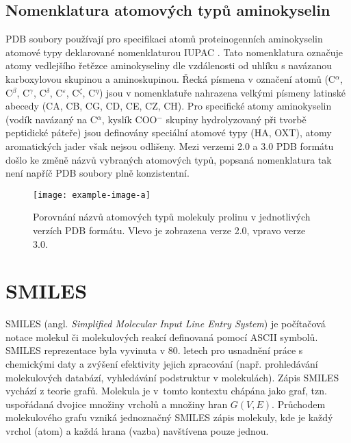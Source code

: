 \subsection{Nomenklatura atomových typů aminokyselin}
PDB soubory používají pro specifikaci atomů proteinogenních aminokyselin atomové typy deklarované nomenklaturou IUPAC \cite{AA_nomenclature}. Tato nomenklatura označuje atomy vedlejšího řetězce aminokyseliny dle vzdálenosti od uhlíku s navázanou karboxylovou skupinou a aminoskupinou. Řecká písmena v označení atomů (C$^\alpha$, C$^\beta$, C$^\gamma$, C$^\delta$, C$^\varepsilon$, C$^\zeta$, C$^\eta$) jsou v nomenklatuře nahrazena velkými písmeny latinské abecedy (CA, CB, CG, CD, CE, CZ, CH). Pro specifické atomy aminokyselin (vodík navázaný na C$^\alpha$, kyslík COO$^-$ skupiny hydrolyzovaný při tvorbě peptidické páteře) jsou definovány speciální atomové typy (HA, OXT), atomy aromatických jader však nejsou odlišeny. Mezi verzemi 2.0 a 3.0 PDB formátu došlo ke změně názvů vybraných atomových typů, popsaná nomenklatura tak není napříč PDB soubory plně konzistentní. 

\begin{figure}[h]
\begin{center}
\texttt{[image: example-image-a]}
\caption{Porovnání názvů atomových typů molekuly prolinu v jednotlivých verzích PDB formátu. Vlevo je zobrazena verze 2.0, vpravo verze 3.0.}
\end{center}
\end{figure}

\section{SMILES}
SMILES \cite{Weininger, Bunin, Leach_chemo} (angl. \textit{Simplified Molecular Input Line Entry System}) je počítačová notace molekul či molekulových reakcí definovaná pomocí ASCII symbolů. SMILES reprezentace byla vyvinuta v 80. letech pro usnadnění práce s chemickými daty  a zvýšení efektivity jejich zpracování (např. prohledávání molekulových databází, vyhledávání podstruktur v molekulách). Zápis SMILES vychází z teorie grafů. Molekula je v~tomto kontextu chápána jako graf, tzn. uspořádaná dvojice množiny vrcholů a množiny hran $G(V,E)$. Průchodem molekulového grafu vzniká jednoznačný SMILES zápis molekuly, kde je každý vrchol (atom) a každá hrana (vazba) navštívena pouze jednou.

